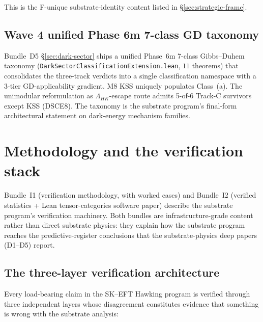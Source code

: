 \documentclass[aps,prd,reprint,nofootinbib,superscriptaddress]{revtex4-2}
\begin{document}
This is the F-unique substrate-identity content listed in
\S\ref{sec:strategic-frame}.

\subsection{Wave 4 unified Phase 6m 7-class GD taxonomy}

Bundle~D5 \S\ref{sec:dark-sector} ships a unified Phase~6m 7-class
Gibbs--Duhem taxonomy (\texttt{DarkSectorClassificationExtension.lean},
$11$ theorems) that consolidates the three-track verdicts into a
single classification namespace with a 3-tier GD-applicability
gradient. M8 KSS uniquely populates Class~(a). The unimodular
reformulation as $\Lambda_{HK}$-escape route admits 5-of-6 Track-C
survivors except KSS (DSCE8). The taxonomy is the substrate program's
final-form architectural statement on dark-energy mechanism families.


\section{Methodology and the verification stack}
\label{sec:methodology}

Bundle~I1 (verification methodology, with worked cases) and Bundle~I2
(verified statistics + Lean tensor-categories software paper) describe
the substrate program's verification machinery. Both bundles are
infrastructure-grade content rather than direct substrate physics:
they explain how the substrate program reaches the predictive-register
conclusions that the substrate-physics deep papers (D1--D5) report.

\subsection{The three-layer verification architecture}

Every load-bearing claim in the SK--EFT Hawking program is verified
through three independent layers whose disagreement constitutes
evidence that something is wrong with the substrate analysis:
\end{document}
